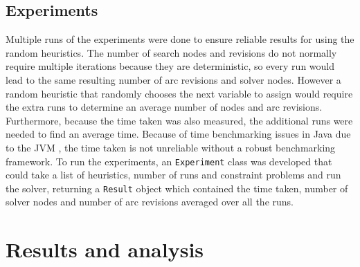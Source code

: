 \documentclass{article}
\begin{document}
\subsection{Experiments}
Multiple runs of the experiments were done to ensure reliable results for using the random heuristics. The number of search nodes and revisions do not normally require multiple iterations because they are deterministic, so every run would lead to the same resulting number of arc revisions and solver nodes. However a random heuristic that randomly chooses the next variable to assign would require the extra runs to determine an average number of nodes and arc revisions. Furthermore, because the time taken was also measured, the additional runs were needed to find an average time. Because of time benchmarking issues in Java due to the JVM \cite{jvm-benchmark}, the time taken is not unreliable without a robust benchmarking framework. 
\n
To run the experiments, an \texttt{Experiment} class was developed that could take a list of heuristics, number of runs and constraint problems and run the solver, returning a \texttt{Result} object which contained the time taken, number of solver nodes and number of arc revisions averaged over all the runs. 

\section{Results and analysis}
\newcommand{\cspplot}[4]{
\begin{tikzpicture}[scale=0.55]
\begin{axis}[
	title = {\textbf{#1}},
	legend pos=south east,
	ymode=log,
	xlabel={#2},
	ylabel={#3}
]

\addplot+[only marks, fill opacity=0.2,
		discard if not={Heuristic}{Smallest Domain First},
] table [x=#2, y=#3, col sep=comma] {data/#4};
\addlegendentry{SDF}

\addplot+[only marks, fill opacity=0.2,
		discard if not={Heuristic}{No heuristic},
] table [x=#2, y=#3, col sep=comma] {data/#4};
\addlegendentry{Ascending Static}

\addplot+[only marks, fill opacity=0.2,
		discard if not={Heuristic}{Maximum Degree},
] table [x=#2, y=#3, col sep=comma] {data/#4};
\addlegendentry{Maximum Degree}

\addplot+[only marks, fill opacity=0.2,
		discard if not={Heuristic}{Random},
] table [x=#2, y=#3, col sep=comma] {data/#4};
\addlegendentry{Random}

\end{axis}
\end{tikzpicture}
}
\end{document}
